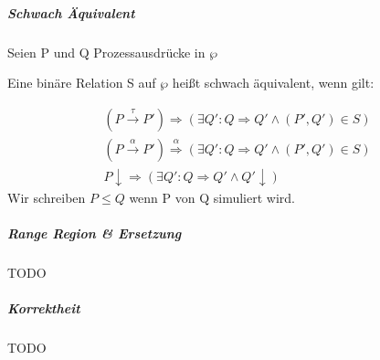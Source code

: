 \documentclass[a4paper,12pt,smallheadings]{scrartcl}
\begin{document}
\subparagraph{Schwach Äquivalent}

Seien P und Q Prozessausdrücke in $\wp$

Eine binäre Relation S auf $\wp$ heißt schwach äquivalent, wenn gilt:

\begin{eqnarray}
(P \overset{\tau}{\rightarrow} P') \Rightarrow (\exists Q': Q \Rightarrow Q' \wedge (P', Q') \in S) \\
(P \overset{\alpha}{\rightarrow} P') \overset{\alpha}{\Rightarrow} (\exists Q': Q \Rightarrow Q' \wedge (P', Q') \in S) \\
P \downarrow \Rightarrow (\exists Q':Q \Rightarrow Q' \wedge Q' \downarrow)
\end{eqnarray}
Wir schreiben $P \leq Q$ wenn P von Q simuliert wird.

\subparagraph{Range Region \& Ersetzung}
TODO

\subparagraph{Korrektheit}
TODO
\end{document}
